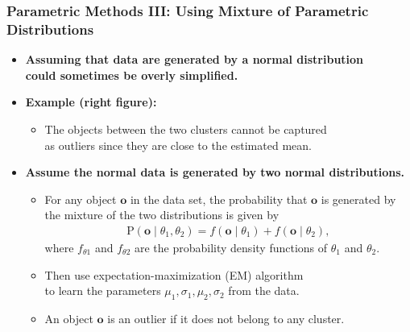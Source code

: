 \begin{frame}
	\frametitle{Parametric Methods III: Using Mixture of Parametric Distributions}
	\begin{itemize}
		\item \textbf{Assuming that data are generated by a normal distribution \\ could sometimes be overly simplified.}
		\item \textbf{Example (right figure):}
		      \begin{itemize}
			      \item The objects between the two clusters cannot be captured \\
			            as outliers since they are close to the estimated mean.
		      \end{itemize}
		\item \textbf{Assume the normal data is generated by {\color{airforceblue}two normal distributions.}}
		      \begin{itemize}
			      \item For any object $\mathbf{o}$ in the data set, the probability that $\mathbf{o}$ is generated by the mixture of the two distributions is given by
			            \begin{align}
				            \text{P}(\mathbf{o} \; \vert \; \theta_1, \theta_2) = f(\mathbf{o} \; \vert \; \theta_1) + f(\mathbf{o} \; \vert \; \theta_2),
			            \end{align}
			            where $f_{\theta 1}$ and $f_{\theta 2}$ are the probability density functions of $\theta_1$ and $\theta_2$.
			      \item Then use expectation-maximization (EM) algorithm \\
			            to learn the parameters $\mu_1, \sigma_1, \mu_2, \sigma_2$ from the data.
			      \item An object $\mathbf{o}$ is an outlier if it does not belong to any cluster.
		      \end{itemize}
	\end{itemize}
\end{frame}



